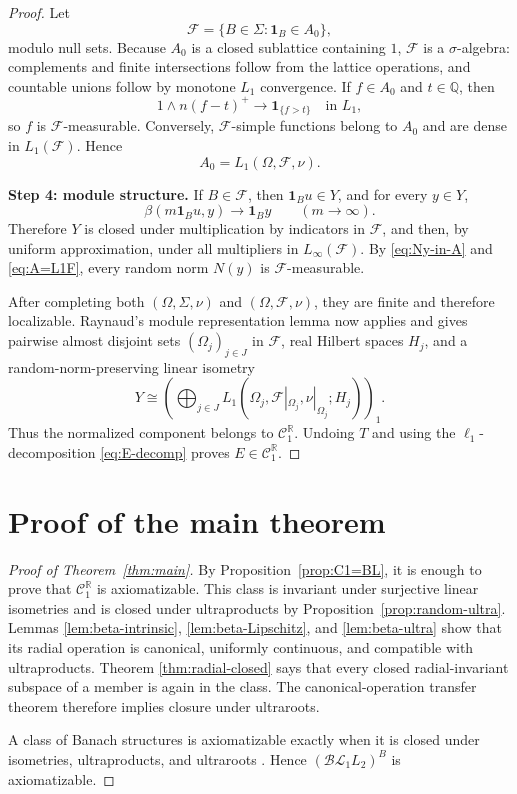 \documentclass[11pt]{article}
\newcommand{\BL}{\mathcal{BL}}
\newcommand{\C}{\mathcal C}
\newcommand{\R}{\mathbb R}
\newcommand{\1}{\mathbf 1}
\theoremstyle{definition}
\theoremstyle{remark}
\begin{document}
\begin{proof}
Let
\[
       \mathcal F=\{B\in\Sigma:\1_B\in A_0\},
\]
modulo null sets.  Because $A_0$ is a closed sublattice containing $1$,
$\mathcal F$ is a $\sigma$-algebra: complements and finite intersections
follow from the lattice operations, and countable unions follow by monotone
$L_1$ convergence.  If $f\in A_0$ and $t\in\mathbb Q$, then
\[
       1\wedge n(f-t)^+\longrightarrow \1_{\{f>t\}}
       \quad\text{in }L_1,
\]
so $f$ is $\mathcal F$-measurable.  Conversely, $\mathcal F$-simple
functions belong to $A_0$ and are dense in $L_1(\mathcal F)$.  Hence
\begin{equation}
\label{eq:A=L1F}
                       A_0=L_1(\Omega,\mathcal F,\nu).
\end{equation}

\medskip
\noindent\textbf{Step 4: module structure.}
If $B\in\mathcal F$, then $\1_Bu\in Y$, and for every $y\in Y$,
\[
       \beta(m\1_Bu,y)\longrightarrow \1_By
       \qquad(m\to\infty).
\]
Therefore $Y$ is closed under multiplication by indicators in $\mathcal F$,
and then, by uniform approximation, under all multipliers in
$L_\infty(\mathcal F)$.  By \eqref{eq:Ny-in-A} and
\eqref{eq:A=L1F}, every random norm $N(y)$ is $\mathcal F$-measurable.

After completing both $(\Omega,\Sigma,\nu)$ and
$(\Omega,\mathcal F,\nu)$, they are finite and therefore localizable.
Raynaud's module representation lemma
\cite[Lemma~4.4]{Raynaud2004} now applies and gives pairwise almost disjoint
sets $(\Omega_j)_{j\in J}$ in $\mathcal F$, real Hilbert spaces $H_j$, and a
random-norm-preserving linear isometry
\[
       Y\cong
       \left(\bigoplus_{j\in J}
       L_1(\Omega_j,\mathcal F|_{\Omega_j},\nu|_{\Omega_j};H_j)
       \right)_1.
\]
Thus the normalized component belongs to $\C_1^{\R}$.  Undoing $T$ and
using the $\ell_1$-decomposition \eqref{eq:E-decomp} proves
$E\in\C_1^{\R}$.
\end{proof}

\section{Proof of the main theorem}

\begin{proof}[Proof of Theorem~\ref{thm:main}]
By Proposition~\ref{prop:C1=BL}, it is enough to prove that
$\C_1^{\R}$ is axiomatizable.  This class is invariant under surjective
linear isometries and is closed under ultraproducts by
Proposition~\ref{prop:random-ultra}.  Lemmas
\ref{lem:beta-intrinsic}, \ref{lem:beta-Lipschitz}, and
\ref{lem:beta-ultra} show that its radial operation is canonical, uniformly
continuous, and compatible with ultraproducts.  Theorem
\ref{thm:radial-closed} says that every closed radial-invariant subspace of a
member is again in the class.  The canonical-operation transfer theorem
therefore implies closure under ultraroots.

A class of Banach structures is axiomatizable exactly when it is closed under
isometries, ultraproducts, and ultraroots
\cite[Proposition~5.14]{BBHU2008}.  Hence $(\BL_1L_2)^B$ is axiomatizable.
\end{proof}
\end{document}
